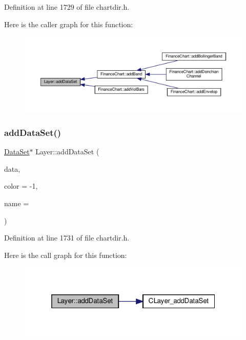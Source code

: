 Definition at line 1729 of file chartdir.\+h.

Here is the caller graph for this function\+:
\nopagebreak
\begin{figure}[H]
\begin{center}
\leavevmode
\includegraphics[width=350pt]{class_layer_a6a53587a5c2a6800573fb4c7a782887b_icgraph}
\end{center}
\end{figure}
\mbox{\label{class_layer_a1189f55e57ec73c1726cb8141c5daf17}} 
\subsubsection{\texorpdfstring{add\+Data\+Set()}{addDataSet()}\hspace{0.1cm}{\footnotesize\ttfamily [2/2]}}
{\footnotesize\ttfamily \hyperlink{class_data_set}{Data\+Set}$\ast$ Layer\+::add\+Data\+Set (\begin{DoxyParamCaption}\item[{\hyperlink{class_double_array}{Double\+Array}}]{data,  }\item[{int}]{color = {\ttfamily -\/1},  }\item[{const char $\ast$}]{name = {} }\end{DoxyParamCaption})\hspace{0.3cm}{\ttfamily [inline]}}



Definition at line 1731 of file chartdir.\+h.

Here is the call graph for this function\+:
\nopagebreak
\begin{figure}[H]
\begin{center}
\leavevmode
\includegraphics[width=319pt]{class_layer_a1189f55e57ec73c1726cb8141c5daf17_cgraph}
\end{center}
\end{figure}
\mbox{\label{class_layer_a6f22ae8bd97228303a91ad9efe6ea3da}} 
